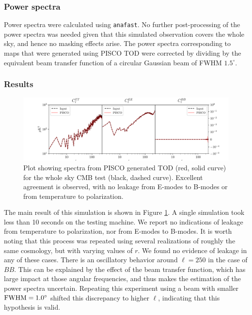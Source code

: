 \documentclass[a4paper,11pt]{article}
\begin{document}
\subsubsection{Power spectra}

Power spectra were calculated using \texttt{anafast}. No further post-processing of the power spectra was needed given that this simulated observation covers the whole sky, and hence no masking effects arise. The power spectra corresponding to maps that were generated using PISCO TOD were corrected by dividing by the equivalent beam transfer function of a circular Gaussian beam of FWHM $1.5^\circ$. 

\subsubsection{Results}

\begin{figure}
	\centering
	\includegraphics[width=1\linewidth]{figures/cmb_r0d00_CLASS_wholeskytest.pdf}
	\caption{Plot showing spectra from PISCO generated TOD (red, solid curve) for the whole sky CMB test (black, dashed curve). Excellent agreement is observed, with no leakage from E-modes to B-modes or from temperature to polarization. }
	\label{fig::pisco4wholesky}
\end{figure}

The main result of this simulation is shown in Figure \ref{fig::pisco4wholesky}. A single simulation took less than 10 seconds on the testing machine. We report no indications of leakage from temperature to polarization, nor from E-modes to B-modes. It is worth noting that this process was repeated using several realizations of roughly the same cosmology, but with varying values of $r$. We found no evidence of leakage in any of these cases. There is an oscillatory behavior around $\ell=250$ in the case of $BB$. This can be explained by the effect of the beam transfer function, which has large impact at those angular frequencies, and thus makes the estimation of the power spectra uncertain. Repeating this experiment using a beam with smaller $\rm{FWHM} = 1.0^{\circ}$ shifted this discrepancy to higher $\ell$, indicating that this hypothesis is valid. 
\end{document}
